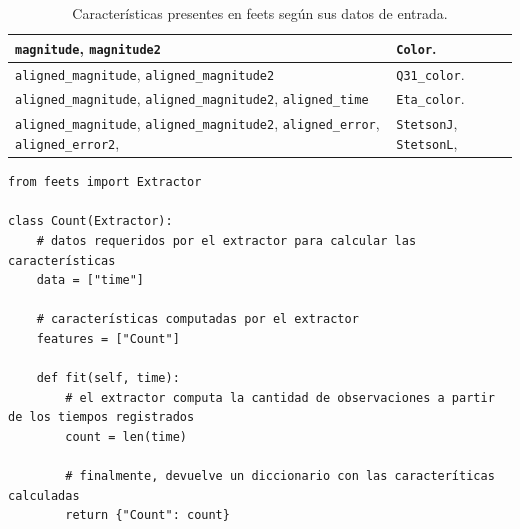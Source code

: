 \begin{table}[!ht]
\begin{tabular}{||p{4cm}|p{7cm}||}
        \texttt{magnitude}, 
        \texttt{magnitude2}
        &
        \texttt{Color}.
        \\
        
        \hline
        
        \texttt{aligned\_magnitude}, 
        \texttt{aligned\_magnitude2}
        &
        \texttt{Q31\_color}.
        \\
        
        \hline
        
        \texttt{aligned\_magnitude}, 
        \texttt{aligned\_magnitude2},
        \texttt{aligned\_time}
        &
        \texttt{Eta\_color}.
        \\
        
        \hline
        
        \texttt{aligned\_magnitude}, 
        \texttt{aligned\_magnitude2},
        \texttt{aligned\_error},
        \texttt{aligned\_error2},
        &
        \texttt{StetsonJ},
        \texttt{StetsonL},
        \\
        
        \hline
    \end{tabular}
    \caption{
        Características presentes en \gls{feets} según sus datos de entrada.
    }
    \label{table:features}
\end{table}

\begin{code}
\begin{verbatim}
from feets import Extractor

class Count(Extractor):
    # datos requeridos por el extractor para calcular las características
    data = ["time"]
    
    # características computadas por el extractor
    features = ["Count"]

    def fit(self, time):
        # el extractor computa la cantidad de observaciones a partir de los tiempos registrados
        count = len(time)

        # finalmente, devuelve un diccionario con las caracteríticas calculadas
        return {"Count": count}
\end{verbatim}
\caption{
    Extractor que computa la cantidad de observaciones en una serie temporal.
}
\label{code:extractor}
\end{code}

